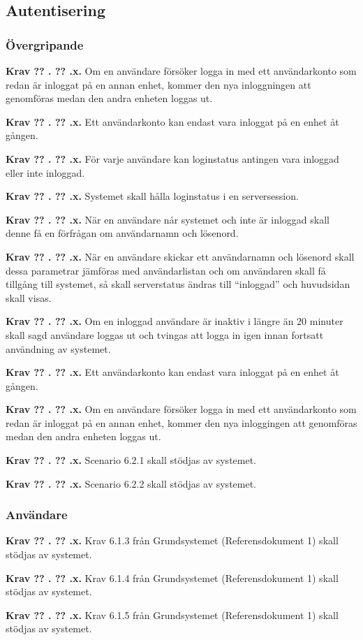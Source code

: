\documentclass[a4paper]{article}
\newcommand\getcurrentref[1]{%
 \ifnumequal{\value{#1}}{0}
  {??}
  {\the\value{#1}}%
}
\newcommand\requirement[2]{
	\numberedrow{Krav}{#1}{#2}
}
\newcommand\numberedrow[3]{
	\noindent
	\textbf{#1 \getcurrentref{section}.\getcurrentref{subsection}.#2.} #3
	
}
\begin{document}
	\subsection{Autentisering}
		\label{krav-funk-aut}
		\subsubsection*{Övergripande}
			\requirement{x}{Om en användare försöker logga in med ett användarkonto som redan är inloggat på en annan enhet, kommer den nya inloggningen att genomföras medan den andra enheten loggas ut. }
			\requirement{x}{Ett användarkonto kan endast vara inloggat på en enhet åt gången.}
			\requirement{x}{För varje användare kan loginstatus antingen vara inloggad eller inte inloggad.}
			\requirement{x}{Systemet skall hålla loginstatus i en serversession.}
			\requirement{x}{När en användare når systemet och inte är inloggad skall denne få en förfrågan om användarnamn och lösenord.}
			\requirement{x}{När en användare skickar ett användarnamn och lösenord skall dessa parametrar jämföras med användarlistan och om användaren skall få tillgång till systemet, så skall serverstatus ändras till “inloggad” och huvudsidan skall visas.}
			\requirement{x}{Om en inloggad användare är inaktiv i längre än 20 minuter skall sagd användare loggas ut och tvingas att logga in igen innan fortsatt användning av systemet.}
			\requirement{x}{Ett användarkonto kan endast vara inloggat på en enhet åt gången.}
			\requirement{x}{Om en användare försöker logga in med ett användarkonto som redan är inloggat på en annan enhet, kommer den nya inloggingen att genomföras medan den andra enheten loggas ut.}
			\requirement{x}{Scenario 6.2.1 skall stödjas av systemet.}
			\requirement{x}{Scenario 6.2.2 skall stödjas av systemet.}
\subsubsection*{Användare}
			\requirement{x}{Krav 6.1.3 från Grundsystemet (Referensdokument 1) skall stödjas av systemet.}
			\requirement{x}{Krav 6.1.4 från Grundsystemet (Referensdokument 1) skall stödjas av systemet.}
			\requirement{x}{Krav 6.1.5 från Grundsystemet (Referensdokument 1) skall stödjas av systemet.}
\end{document}
